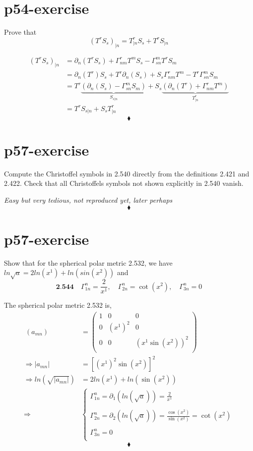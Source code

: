\section{p54-exercise}
\begin{tcolorbox}
Prove that $$(T^rS_s)_{|n} = T^r_{|n}S_s+T^rS_{|n}$$
\end{tcolorbox}
\begin{align} (T^rS_s)_{|n} &=  \partial_n(T^rS_s) + \Gamma^r_{nm}T^mS_s - \Gamma^m_{sn}T^rS_m\\
\ &=  \partial_n(T^r)S_s+ T^r\partial_n(S_s) + S_s\Gamma^r_{nm}T^m - T^r\Gamma^m_{sn}S_m\\
\ &=  T^r\underbrace{(\partial_n(S_s) - \Gamma^m_{sn}S_m)}_{S_{s|n}}+S_s\underbrace{(\partial_n(T^r)+ \Gamma^r_{nm}T^m)}_{T^r_{|n}}\\
\ &=  T^rS_{s|n}+S_sT^r_{|n}
\end{align}
$$\blacklozenge$$
\newpage

\section{p57-exercise}
\begin{tcolorbox}
Compute the Christoffel symbols in 2.540 directly from the definitions 2.421 and 2.422. Check that all Christoffels symbols not shown explicitly in 2.540 vanish.
\end{tcolorbox}
\textit{Easy but very tedious, not reproduced yet, later perhaps}
$$\blacklozenge$$
\newpage

\section{p57-exercise}
\begin{tcolorbox}
Show that for the spherical polar metric 2.532, we have $ln\sqrt{a} = 2 ln(x^1)+ln(sin(x^2))$ and 
$$\textbf{2.544}\quad \Gamma^n_{1n} = \frac{2}{x^1},\quad \Gamma^n_{2n} = \cot (x^2),\quad\Gamma^n_{3n} =0$$
\end{tcolorbox}
The spherical polar metric 2.532 is,
\begin{align}
\ (a_{mn})&= \begin{pmatrix}
 1& 0 & 0 \\
 0& (x^1)^2 & 0 \\
 0& 0 & (x^1 \sin (x^2))^2 \\
\end{pmatrix}\\
\Rightarrow |a_{mn}| &= \left[(x^1)^2 \sin (x^2)\right]^2\\
\Rightarrow ln(\sqrt{|a_{mn}|}) &= 2ln(x^1)+ln(\sin (x^2))\\
\Rightarrow\quad\quad &\left \{\begin{array}{c}
\Gamma^n_{1n} = \partial_1(ln(\sqrt{a})) = \frac{2}{x^1}\\\\
\Gamma^n_{2n} = \partial_2(ln(\sqrt{a})) = \frac{\cos(x^2)}{\sin(x^2)} =  \cot (x^2)\\\\
\Gamma^n_{3n} = 0\\
\end{array}\right.
\end{align} 
$$\blacklozenge$$
\newpage

